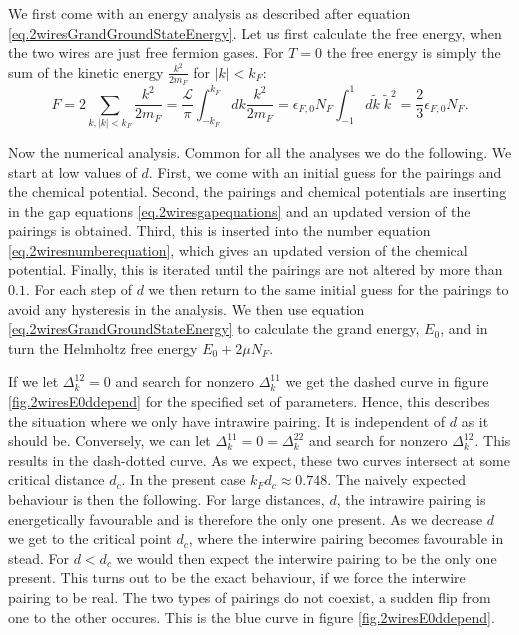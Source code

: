 We first come with an energy analysis as described after equation \eqref{eq.2wiresGrandGroundStateEnergy}. Let us first calculate the free energy, when the two wires are just free fermion gases. For $T = 0$ the free energy is simply the sum of the kinetic energy $\frac{k^2}{2m_F}$ for $|k| < k_F$: 
\begin{equation}
F = 2\sum_{k, |k| < k_F} \frac{k^2}{2m_F} = \frac{\mathcal{L}}{\pi} \int^{k_F}_{-k_F} dk \frac{k^2}{2m_F} = \epsilon_{F,0} N_F \int^{1}_{-1} d\tilde{k}\; \tilde{k}^2 = \frac{2}{3}\epsilon_{F,0} N_F. 
\end{equation}

Now the numerical analysis. Common for all the analyses we do the following. We start at low values of $d$. First, we come with an initial guess for the pairings and the chemical potential. Second, the pairings and chemical potentials are inserting in the gap equations \ref{eq.2wiresgapequations} and an updated version of the pairings is obtained. Third, this is inserted into the number equation \ref{eq.2wiresnumberequation}, which gives an updated version of the chemical potential. Finally, this is iterated until the pairings are not altered by more than $0.1$\textperthousand. For each step of $d$ we then return to the same initial guess for the pairings to avoid any hysteresis in the analysis. We then use equation \eqref{eq.2wiresGrandGroundStateEnergy} to calculate the grand energy, $E_0$, and in turn the Helmholtz free energy $E_0 + 2\mu N_F$.  

If we let $\Delta^{12}_k = 0$ and search for nonzero $\Delta^{11}_k$ we get the dashed curve in figure \ref{fig.2wiresE0ddepend} for the specified set of parameters. Hence, this describes the situation where we only have intrawire pairing. It is independent of $d$ as it should be. Conversely, we can let $\Delta^{11}_k = 0 = \Delta^{22}_k$ and search for nonzero $\Delta^{12}_k$. This results in the dash-dotted curve. As we expect, these two curves intersect at some critical distance $d_c$. In the present case $k_Fd_c \approx 0.748$. The naively expected behaviour is then the following. For large distances, $d$, the intrawire pairing is energetically favourable and is therefore the only one present. As we decrease $d$ we get to the critical point $d_c$, where the interwire pairing becomes favourable in stead. For $d < d_c$ we would then expect the interwire pairing to be the only one present. This turns out to be the exact behaviour, if we force the interwire pairing to be real. The two types of pairings do not coexist, a sudden flip from one to the other occures. This is the blue curve in figure \ref{fig.2wiresE0ddepend}. 

